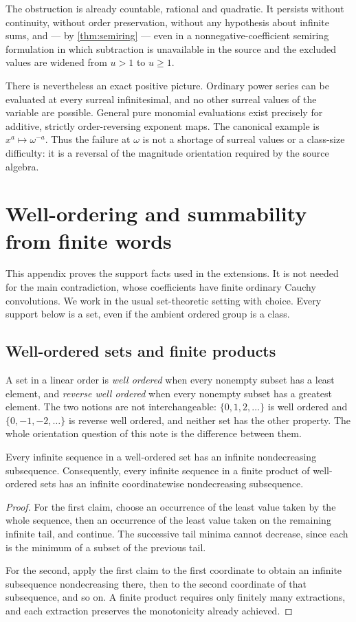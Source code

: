 \documentclass[11pt,letterpaper]{article}
\theoremstyle{definition}
\theoremstyle{remark}
\newenvironment{lemma}{\crefalias{theorem}{lemma}\lemmax}{\endlemmax}
\begin{document}
The obstruction is already countable, rational and quadratic. It persists
without continuity, without order preservation, without any hypothesis about
infinite sums, and --- by \cref{thm:semiring} --- even in a
nonnegative-coefficient semiring formulation in which subtraction is
unavailable in the source and the excluded values are widened from $u>1$ to
$u\ge1$.

There is nevertheless an exact positive picture. Ordinary power series can
be evaluated at every surreal infinitesimal, and no other surreal values of
the variable are possible. General pure monomial evaluations exist precisely
for additive, strictly order-reversing exponent maps. The canonical example
is $x^a\mapsto\omega^{-a}$. Thus the failure at $\omega$ is not a shortage of
surreal values or a class-size difficulty: it is a reversal of the magnitude
orientation required by the source algebra.

\appendix
\section{Well-ordering and summability from finite words}\label{app:summability}
This appendix proves the support facts used in the extensions. It is not
needed for the main contradiction, whose coefficients have finite ordinary
Cauchy convolutions. We work in the usual set-theoretic setting with choice.
Every support below is a set, even if the ambient ordered group is a class.

\subsection{Well-ordered sets and finite products}\label{app:products}
A set in a linear order is \emph{well ordered} when every nonempty subset has
a least element, and \emph{reverse well ordered} when every nonempty subset
has a greatest element. The two notions are not interchangeable:
$\{0,1,2,\ldots\}$ is well ordered and $\{0,-1,-2,\ldots\}$ is reverse well
ordered, and neither set has the other property. The whole orientation
question of this note is the difference between them.

\begin{lemma}[Nondecreasing subsequences]\label{lem:subseq}
Every infinite sequence in a well-ordered set has an infinite nondecreasing
subsequence. Consequently, every infinite sequence in a finite product of
well-ordered sets has an infinite coordinatewise nondecreasing subsequence.
\end{lemma}
\begin{proof}
For the first claim, choose an occurrence of the least value taken by the
whole sequence, then an occurrence of the least value taken on the remaining
infinite tail, and continue. The successive tail minima cannot decrease, since
each is the minimum of a subset of the previous tail.

For the second, apply the first claim to the first coordinate to obtain an
infinite subsequence nondecreasing there, then to the second coordinate of
that subsequence, and so on. A finite product requires only finitely many
extractions, and each extraction preserves the monotonicity already achieved.
\end{proof}
\end{document}
